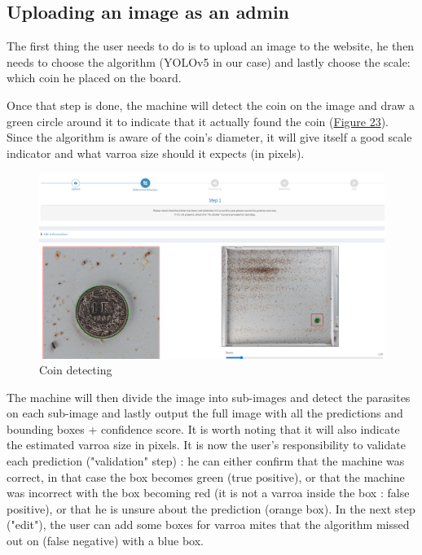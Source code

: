 \documentclass{article}
\begin{document}
\subsection{Uploading an image as an admin}

The first thing the user needs to do is to upload an image to the website, he then needs to choose the algorithm (YOLOv5 in our case) and lastly choose the scale: which coin he placed on the board.

Once that step is done, the machine will detect the coin on the image and draw a green circle around it to indicate that it actually found the coin (\hyperref[Figure 23]{Figure 23}). Since the algorithm is aware of the coin's diameter, it will give itself a good scale indicator and what varroa size should it expects (in pixels). 

\begin{figure}[!ht]
  \centering
  \includegraphics[scale=0.4]{website/scale.PNG}
  \caption{Coin detecting}
  \label{Figure 23}
\end{figure}

\bigskip

The machine will then divide the image into sub-images and detect the parasites on each sub-image and lastly output the full image with all the predictions and bounding boxes + confidence score. It is worth noting that it will also indicate the estimated varroa size in pixels. It is now the user's responsibility to validate each prediction ("validation" step) : he can either confirm that the machine was correct, in that case the box becomes green (true positive), or that the machine was incorrect with the box becoming red (it is not a varroa inside the box : false positive), or that he is unsure about the prediction (orange box). In the next step ("edit"), the user can add some boxes for varroa mites that the algorithm missed out on (false negative) with a blue box.
\end{document}
